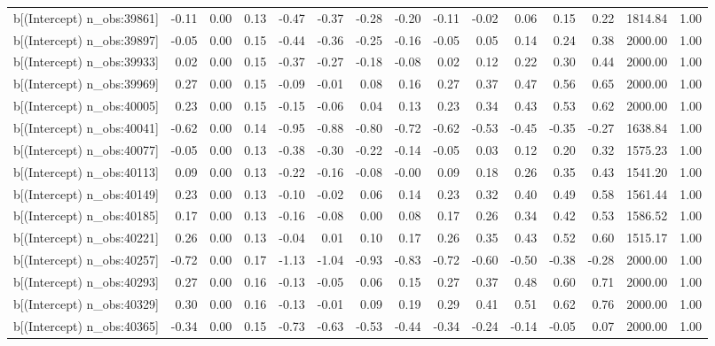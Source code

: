 \begin{table}[ht]
\begin{tabular}{rrrrrrrrrrrrrrr}
  b[(Intercept) n\_obs:39861] & -0.11 & 0.00 & 0.13 & -0.47 & -0.37 & -0.28 & -0.20 & -0.11 & -0.02 & 0.06 & 0.15 & 0.22 & 1814.84 & 1.00 \\ 
  b[(Intercept) n\_obs:39897] & -0.05 & 0.00 & 0.15 & -0.44 & -0.36 & -0.25 & -0.16 & -0.05 & 0.05 & 0.14 & 0.24 & 0.38 & 2000.00 & 1.00 \\ 
  b[(Intercept) n\_obs:39933] & 0.02 & 0.00 & 0.15 & -0.37 & -0.27 & -0.18 & -0.08 & 0.02 & 0.12 & 0.22 & 0.30 & 0.44 & 2000.00 & 1.00 \\ 
  b[(Intercept) n\_obs:39969] & 0.27 & 0.00 & 0.15 & -0.09 & -0.01 & 0.08 & 0.16 & 0.27 & 0.37 & 0.47 & 0.56 & 0.65 & 2000.00 & 1.00 \\ 
  b[(Intercept) n\_obs:40005] & 0.23 & 0.00 & 0.15 & -0.15 & -0.06 & 0.04 & 0.13 & 0.23 & 0.34 & 0.43 & 0.53 & 0.62 & 2000.00 & 1.00 \\ 
  b[(Intercept) n\_obs:40041] & -0.62 & 0.00 & 0.14 & -0.95 & -0.88 & -0.80 & -0.72 & -0.62 & -0.53 & -0.45 & -0.35 & -0.27 & 1638.84 & 1.00 \\ 
  b[(Intercept) n\_obs:40077] & -0.05 & 0.00 & 0.13 & -0.38 & -0.30 & -0.22 & -0.14 & -0.05 & 0.03 & 0.12 & 0.20 & 0.32 & 1575.23 & 1.00 \\ 
  b[(Intercept) n\_obs:40113] & 0.09 & 0.00 & 0.13 & -0.22 & -0.16 & -0.08 & -0.00 & 0.09 & 0.18 & 0.26 & 0.35 & 0.43 & 1541.20 & 1.00 \\ 
  b[(Intercept) n\_obs:40149] & 0.23 & 0.00 & 0.13 & -0.10 & -0.02 & 0.06 & 0.14 & 0.23 & 0.32 & 0.40 & 0.49 & 0.58 & 1561.44 & 1.00 \\ 
  b[(Intercept) n\_obs:40185] & 0.17 & 0.00 & 0.13 & -0.16 & -0.08 & 0.00 & 0.08 & 0.17 & 0.26 & 0.34 & 0.42 & 0.53 & 1586.52 & 1.00 \\ 
  b[(Intercept) n\_obs:40221] & 0.26 & 0.00 & 0.13 & -0.04 & 0.01 & 0.10 & 0.17 & 0.26 & 0.35 & 0.43 & 0.52 & 0.60 & 1515.17 & 1.00 \\ 
  b[(Intercept) n\_obs:40257] & -0.72 & 0.00 & 0.17 & -1.13 & -1.04 & -0.93 & -0.83 & -0.72 & -0.60 & -0.50 & -0.38 & -0.28 & 2000.00 & 1.00 \\ 
  b[(Intercept) n\_obs:40293] & 0.27 & 0.00 & 0.16 & -0.13 & -0.05 & 0.06 & 0.15 & 0.27 & 0.37 & 0.48 & 0.60 & 0.71 & 2000.00 & 1.00 \\ 
  b[(Intercept) n\_obs:40329] & 0.30 & 0.00 & 0.16 & -0.13 & -0.01 & 0.09 & 0.19 & 0.29 & 0.41 & 0.51 & 0.62 & 0.76 & 2000.00 & 1.00 \\ 
  b[(Intercept) n\_obs:40365] & -0.34 & 0.00 & 0.15 & -0.73 & -0.63 & -0.53 & -0.44 & -0.34 & -0.24 & -0.14 & -0.05 & 0.07 & 2000.00 & 1.00 \\ 

\end{tabular}
\end{table}
